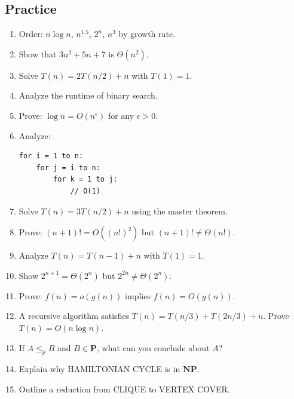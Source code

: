 \subsection*{Practice}
\begin{enumerate}
  \item Order: $n \log n$, $n^{1.5}$, $2^n$, $n^3$ by growth rate.

  \item Show that $3n^2 + 5n + 7$ is $\Theta(n^2)$.

  \item Solve $T(n) = 2T(n/2) + n$ with $T(1) = 1$.

  \item Analyze the runtime of binary search.

  \item Prove: $\log n = O(n^\epsilon)$ for any $\epsilon > 0$.

  \item Analyze:
\begin{verbatim}
for i = 1 to n:
    for j = i to n:
        for k = 1 to j:
            // O(1)
\end{verbatim}

  \item Solve $T(n) = 3T(n/2) + n$ using the master theorem.

  \item Prove: $(n+1)! = O((n!)^2)$ but $(n+1)! \neq \Theta(n!)$.

  \item Analyze $T(n) = T(n-1) + n$ with $T(1) = 1$.

  \item Show $2^{n+1} = \Theta(2^n)$ but $2^{2n} \neq \Theta(2^n)$.

  \item Prove: $f(n) = o(g(n))$ implies $f(n) = O(g(n))$.

  \item A recursive algorithm satisfies $T(n) = T(n/3) + T(2n/3) + n$. Prove $T(n) = O(n \log n)$.

  \item If $A \leq_p B$ and $B \in \mathbf{P}$, what can you conclude about $A$?

  \item Explain why HAMILTONIAN CYCLE is in $\mathbf{NP}$.

  \item Outline a reduction from CLIQUE to VERTEX COVER.
\end{enumerate}
